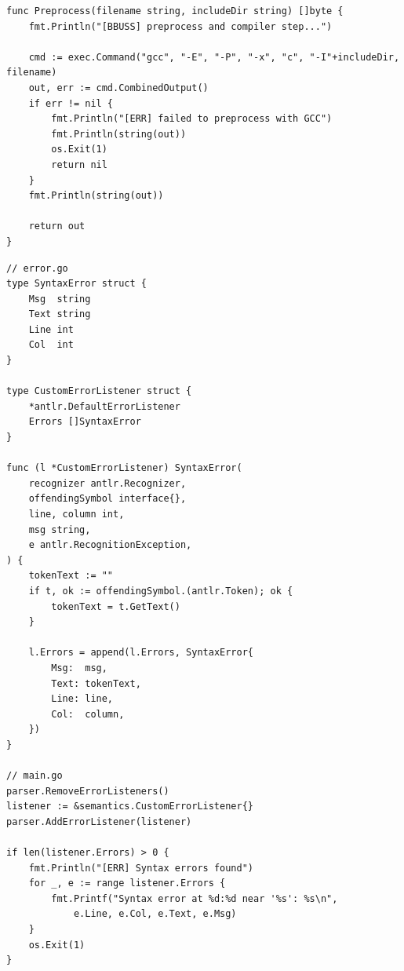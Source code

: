 \begin{lstlisting}[caption={Warstwa pośrednia dla preprocesowania GCC}, label={lst:cli-gcc}, morekeywords={func, string, nil}]
func Preprocess(filename string, includeDir string) []byte {
	fmt.Println("[BBUSS] preprocess and compiler step...")

	cmd := exec.Command("gcc", "-E", "-P", "-x", "c", "-I"+includeDir, filename)
	out, err := cmd.CombinedOutput()
	if err != nil {
		fmt.Println("[ERR] failed to preprocess with GCC")
		fmt.Println(string(out))
		os.Exit(1)
		return nil
	}
	fmt.Println(string(out))

	return out
}
\end{lstlisting}

\begin{lstlisting}[caption={Definicja błędów parsera}, label={lst:err-parser}, morekeywords={type, string, nil}]
// error.go
type SyntaxError struct {
    Msg  string
    Text string
    Line int
    Col  int
}

type CustomErrorListener struct {
    *antlr.DefaultErrorListener
    Errors []SyntaxError
}

func (l *CustomErrorListener) SyntaxError(
    recognizer antlr.Recognizer,
    offendingSymbol interface{},
    line, column int,
    msg string,
    e antlr.RecognitionException,
) {
    tokenText := ""
    if t, ok := offendingSymbol.(antlr.Token); ok {
        tokenText = t.GetText()
    }

    l.Errors = append(l.Errors, SyntaxError{
        Msg:  msg,
        Text: tokenText,
        Line: line,
        Col:  column,
    })
}

// main.go
parser.RemoveErrorListeners()
listener := &semantics.CustomErrorListener{}
parser.AddErrorListener(listener)

if len(listener.Errors) > 0 {
	fmt.Println("[ERR] Syntax errors found")
	for _, e := range listener.Errors {
		fmt.Printf("Syntax error at %d:%d near '%s': %s\n", 
			e.Line, e.Col, e.Text, e.Msg)
	}
	os.Exit(1)
}

\end{lstlisting}

